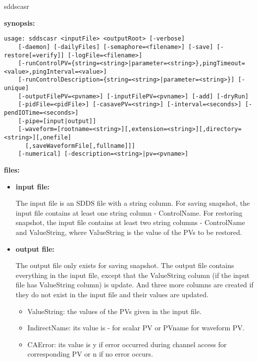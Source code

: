 \begin{sddsprog}{sddscasr}
\item \textbf{synopsis:}
\begin{verbatim}
usage: sddscasr <inputFile> <outputRoot> [-verbose]
    [-daemon] [-dailyFiles] [-semaphore=<filename>] [-save] [-restore[=verify]] [-logFile=<filename>]
    [-runControlPV={string=<string>|parameter=<string>},pingTimeout=<value>,pingInterval=<value>]
    [-runControlDescription={string=<string>|parameter=<string>}] [-unique]
    [-outputFilePV=<pvname>] [-inputFilePV=<pvname>] [-add] [-dryRun]
    [-pidFile=<pidFile>] [-casavePV=<string>] [-interval=<seconds>] [-pendIOTime=<seconds>]
    [-pipe=[input|output]] 
    [-waveform=[rootname=<string>][,extension=<string>][,directory=<string>][,onefile]
      [,saveWaveformFile[,fullname]]]
    [-numerical] [-description=<string>|pv=<pvname>]
\end{verbatim}
\item \textbf{files:}
\begin{itemize}
  \item \textbf{input file:} \par
The input file is an SDDS file with a string column. For saving snapshot, the input file
contains at least one string column - ControlName. For restoring snapshot, the input file
contains at least two string columns - ControlName and ValueString, where ValueString is the
value of the PVs to be restored.
  \item \textbf{output file:} \par
The output file only exists for saving snapshot. The output file contains everything in the input
file, except that the ValueString column (if the input file has ValueString column) is update. And
three more columns are created if they do not exist in the input file and their values are updated.
  \begin{itemize}
    \item {ValueString}: the values of the PVs given in the input file.
    \item {IndirectName}: its value  is - for scalar PV or PVname for waveform PV.
    \item {CAError}: its value is y if error occurred during channel access for
corresponding PV or n if no error occurs.
  \end{itemize}
\end{itemize}


\end{sddsprog}
